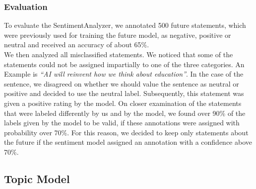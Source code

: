 \subsubsection{Evaluation}
To evaluate the SentimentAnalyzer, we annotated 500 future statements, which were previously used for training the future model, as negative, positive or neutral and received an accuracy of about 65\%.
\\
We then analyzed all misclassified statements.
We noticed that some of the statements could not be assigned impartially to one of the three categories.
An Example is \emph{``AI will reinvent how we think about education''}.
In the case of the sentence, we disagreed on whether we should value the sentence as neutral or positive and decided to use the neutral label.
Subsequently, this statement was given a positive rating by the model.
On closer examination of the statements that were labeled differently by us and by the model, we found over 90\% of the labels given by the model to be valid, if these annotations were assigned with probability over 70\%.
For this reason, we decided to keep only statements about the future if the sentiment model assigned an annotation with a confidence above 70\%.

\subsection{Topic Model}
\label{topic-model}
